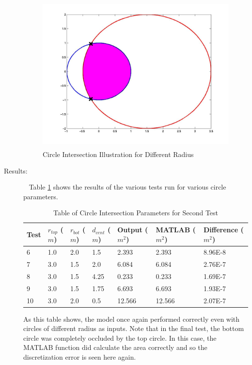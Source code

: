 \begin{description}
\begin{figure}[H]
\begin{center}
\includegraphics[height=80mm]{pics/circle_area2.jpg}
\caption{Circle Intersection Illustration for Different Radius}
\label{diff_circle_plot}
\end{center}
\end{figure}

\item[Results:]\ \newline
Table \ref{diff_rad_table} shows the results of the various tests run for
various circle parameters.
\begin{table}[ht]
\begin{tabular}{|l|l|l|l|l|l|l|}\hline
Test & $r_{top}$ ($m$) & $r_{bot}$ ($m$) & $d_{cent}$ ($m$) & Output ($m^2$) &
   MATLAB ($m^2$) & Difference ($m^2$) \\ \hline
6 & 1.0 & 2.0 & 1.5 & 2.393 & 2.393 & 8.96E-8 \\ \hline
7 & 3.0 & 1.5 & 2.0 & 6.084 & 6.084 & 2.76E-7 \\ \hline
8 & 3.0 & 1.5 & 4.25 & 0.233 & 0.233 & 1.69E-7 \\ \hline
9 & 3.0 & 1.5 & 1.75 & 6.693 & 6.693 & 1.93E-7 \\ \hline
10 & 3.0 & 2.0 & 0.5 & 12.566 & 12.566 & 2.07E-7 \\ \hline
\end{tabular}
\caption{Table of Circle Intersection Parameters for Second Test}
\label{diff_rad_table}
\end{table}

As this table shows, the model once again performed correctly even with circles
of different radius as inputs.  Note that in the final test, the bottom circle
was completely occluded by the top circle.  In this case, the MATLAB function
did calculate the area correctly and so the discretization error is seen here
again.

\end{description}

